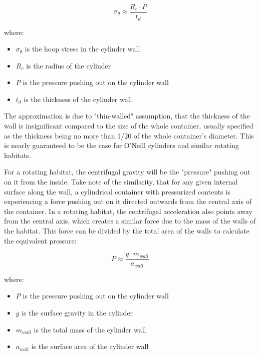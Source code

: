 \documentclass[a4paper]{article}
\begin{document}
	$$ \sigma_\theta \approx \frac{R_c \cdot P}{t_d} $$
	
	where:
	
	\begin{itemize}
		\item $\sigma_\theta$ is the hoop stress in the cylinder wall
		
		\item $R_c$ is the radius of the cylinder
		
		\item $P$ is the pressure pushing out on the cylinder wall
		
		\item $t_d$ is the thickness of the cylinder wall
	\end{itemize}
	
	The approximation is due to "thin-walled" assumption, that the thickness of the wall is insignificant compared to the size of the whole container, usually specified as the thickness being no more than 1/20 of the whole container's diameter. This is nearly guaranteed to be the case for O'Neill cylinders and similar rotating habitats.
	
	\medskip
	
	For a rotating habitat, the centrifugal gravity will be the "pressure" pushing out on it from the inside. Take note of the similarity, that for any given internal surface along the wall, a cylindrical container with pressurized contents is experiencing a force pushing out on it directed outwards from the central axis of the container. In a rotating habitat, the centrifugal acceleration also points away from the central axis, which creates a similar force due to the mass of the walls of the habitat. This force can be divided by the total area of the walls to calculate the equivalent pressure:
	
	$$ P \approx \frac{g \cdot m_{wall}}{a_{wall}} $$
	
	where:
	
	\begin{itemize}
		\item $P$ is the pressure pushing out on the cylinder wall
		
		\item $g$ is the surface gravity in the cylinder
		
		\item $m_{wall}$ is the total mass of the cylinder wall
		
		\item $a_{wall}$ is the surface area of the cylinder wall
	\end{itemize}
	
\end{document}
